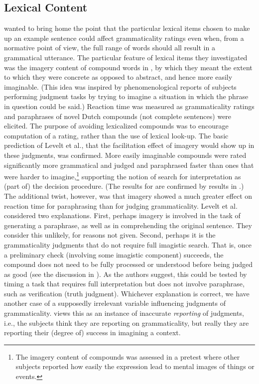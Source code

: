 \subsection{Lexical Content}\label{sec:5.3.5} 

\citet{LeveltEtAl1977} wanted to bring home the point that the particular lexical items chosen to make up an example sentence could affect grammaticality
ratings even when, from a normative point of view, the full range of words should all result in a grammatical utterance. The particular feature of lexical items they investigated was the imagery content of compound words in , by which they meant the extent to which they were concrete as opposed to abstract, and hence more easily imaginable. (This idea was inspired by phenomenological reports of subjects performing judgment tasks by trying to imagine a situation in which the phrase in question could be said.) Reaction time was measured as grammaticality ratings and paraphrases of novel Dutch compounds (not complete sentences) were elicited. The purpose of avoiding lexicalized compounds was to encourage computation of a rating, rather than the use of lexical look-up. The basic prediction of Levelt et al., that the facilitation effect of imagery would show up in these judgments, was confirmed. More easily imaginable compounds were rated significantly more grammatical and judged and paraphrased faster than ones that were harder to imagine,\footnote{The imagery content of compounds was assessed in a pretest where other subjects reported how easily the expression lead to mental images of things or events.}
 supporting the notion of search for interpretation as (part of) the decision procedure. (The results for  are confirmed by results in \citet{GrantEtAl1977}.)
 The additional twist, however, was that imagery showed a much greater effect on reaction time for paraphrasing than for judging grammaticality. Levelt et al. considered two explanations. First, perhaps imagery is involved in the task of generating a paraphrase, as well as in comprehending the original sentence. They consider this unlikely, for reasons not given. Second, perhaps it is the grammaticality judgments that do not require full imagistic search. That is, once a preliminary check (involving some imagistic component) succeeds, the compound does not need to be fully processed or understood before being judged as good (see the discussion in ). As the authors suggest, this could be tested by timing a task that requires full interpretation but does not involve paraphrase, such as verification (truth judgment). Whichever explanation is correct, we have another case of a supposedly irrelevant variable influencing judgments of grammaticality. \citet{McCawley1985} views this as an instance of inaccurate \textit{reporting} of judgments, i.e., the subjects think they are reporting on grammaticality, but really they are reporting their (degree of) success in imagining a context.

